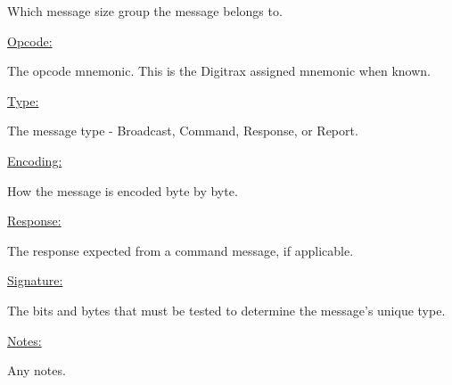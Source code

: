 Which message size group the message belongs to.

\underline{Opcode:}

The opcode mnemonic. This is the Digitrax assigned mnemonic when known.

\underline{Type:}

The message type - \gls{Broadcast}, \gls{Command}, \gls{Response}, or \gls{Report}.

\underline{Encoding:} 

How the message is encoded byte by byte.

\underline{Response:} 

The response expected from a command message, if applicable.

\underline{Signature:}

The bits and bytes that must be tested to determine the message's unique type.

\underline{Notes:} 

Any notes.





































































